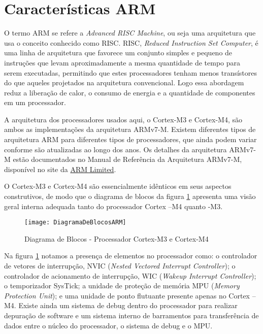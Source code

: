 \section{Características ARM}

O termo ARM se refere a \emph{Advanced RISC Machine}, ou seja uma arquitetura que usa o conceito conhecido como RISC. RISC, \emph{Reduced Instruction Set Computer}, é uma linha de arquitetura que favorece um conjunto simples e pequeno de instruções que levam aproximadamente a mesma quantidade de tempo para serem executadas, permitindo que estes processadores tenham menos transístores do que aqueles projetados na arquitetura convencional. Logo essa abordagem reduz a liberação de calor, o consumo de energia e a quantidade de componentes em um processador.

A arquitetura dos processadores usados aqui, o Cortex-M3 e Cortex-M4, são ambos as implementações da arquitetura ARMv7-M. Existem diferentes tipos de arquitetura ARM para diferentes tipos de processadores, que ainda podem variar conforme são atualizadas ao longo dos anos. Os detalhes da arquitetura ARMv7-M estão documentados no Manual de Referência da Arquitetura  ARMv7-M, disponível no site da  \href{http://infocenter.arm.com/help/index.jsp}{ARM Limited}.

O Cortex-M3 e Cortex-M4 são essencialmente idênticos em seus aspectos construtivos, de modo que o diagrama de blocos da figura \ref{DiagramaDeBlocosARM}  apresenta uma visão  geral interna adequada tanto do processador Cortex –M4 quanto -M3.

\begin{figure}[h]
	\centering
	\texttt{[image: DiagramaDeBlocosARM]}
	\caption{Diagrama de Blocos - Processador Cortex-M3 e Cortex-M4 \cite{DATASHEET_TIVA}}
	\label{DiagramaDeBlocosARM}
\end{figure}

Na figura \ref{DiagramaDeBlocosARM} notamos a presença de elementos no processador como:  o controlador de vetores de interrupção, NVIC (\emph{Nested Vectored Interrupt Controller}); o controlador de acionamento de interrupção, WIC (\emph{Wakeup Interrupt Controller}); o temporizador SysTick; a unidade de proteção de memória MPU (\emph{Memory Protection Unit}); e uma unidade de ponto flutuante presente apenas no Cortex –M4. Existe ainda um sistema de debug dentro do processador para realizar depuração de software e um sistema interno de barramentos para transferência de dados entre o núcleo do processador, o sistema de debug e o MPU. 

